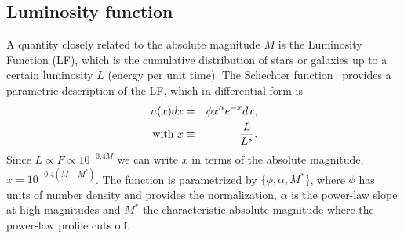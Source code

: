 \subsection{Luminosity function}
A quantity closely related to the absolute magnitude $M$ is the Luminosity Function (LF), which is the cumulative distribution of stars or galaxies up to a certain luminosity $L$ (energy per unit time). The Schechter function~\citep{Schechter1976} provides a parametric description of the LF, which in differential form is
\begin{eqnarray}
n(x)dx &=& \phi x^\alpha e^{-x}dx, \\
\mbox{with}\ x &\equiv& {L \over L^*}.
\end{eqnarray}
Since $L \propto F \propto 10^{-0.4M}$ we can write $x$ in terms of the absolute magnitude, $x = 10^{-0.4(M-M^*)}$. The function is parametrized by $\lbrace \phi, \alpha, M^*  \rbrace$, where $\phi$ has units of number density and provides the normalization, $\alpha$ is the power-law slope at high magnitudes and $M^*$ the characteristic absolute magnitude where the power-law profile cuts off.

